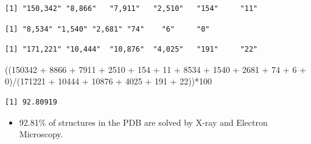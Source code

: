 \documentclass[
  letterpaper,
  DIV=11,
  numbers=noendperiod]{scrartcl}
\newenvironment{Shaded}{\begin{snugshade}}{\end{snugshade}}
\newcommand{\DecValTok}[1]{\textcolor[rgb]{0.68,0.00,0.00}{#1}}
\newcommand{\NormalTok}[1]{\textcolor[rgb]{0.00,0.23,0.31}{#1}}
\newcommand{\SpecialCharTok}[1]{\textcolor[rgb]{0.37,0.37,0.37}{#1}}
\providecommand{\tightlist}{%
  \setlength{\itemsep}{0pt}\setlength{\parskip}{0pt}}\usepackage{longtable,booktabs,array}
\begin{document}
\begin{verbatim}
[1] "150,342" "8,866"   "7,911"   "2,510"   "154"     "11"     
\end{verbatim}

\begin{Shaded}
\end{Shaded}

\begin{verbatim}
[1] "8,534" "1,540" "2,681" "74"    "6"     "0"    
\end{verbatim}

\begin{Shaded}
\end{Shaded}

\begin{verbatim}
[1] "171,221" "10,444"  "10,876"  "4,025"   "191"     "22"     
\end{verbatim}

\begin{Shaded}
\begin{Highlighting}[]
\NormalTok{((}\DecValTok{150342} \SpecialCharTok{+} \DecValTok{8866} \SpecialCharTok{+} \DecValTok{7911} \SpecialCharTok{+} \DecValTok{2510} \SpecialCharTok{+} \DecValTok{154} \SpecialCharTok{+} \DecValTok{11} \SpecialCharTok{+} \DecValTok{8534} \SpecialCharTok{+} \DecValTok{1540} \SpecialCharTok{+} \DecValTok{2681} \SpecialCharTok{+} \DecValTok{74} \SpecialCharTok{+} \DecValTok{6} \SpecialCharTok{+} \DecValTok{0}\NormalTok{)}\SpecialCharTok{/}\NormalTok{(}\DecValTok{171221} \SpecialCharTok{+} \DecValTok{10444} \SpecialCharTok{+} \DecValTok{10876} \SpecialCharTok{+} \DecValTok{4025} \SpecialCharTok{+} \DecValTok{191} \SpecialCharTok{+} \DecValTok{22}\NormalTok{))}\SpecialCharTok{*}\DecValTok{100}
\end{Highlighting}
\end{Shaded}

\begin{verbatim}
[1] 92.80919
\end{verbatim}

\begin{itemize}
\tightlist
\item
  92.81\% of structures in the PDB are solved by X-ray and Electron
  Microscopy.
\end{itemize}
\end{document}
